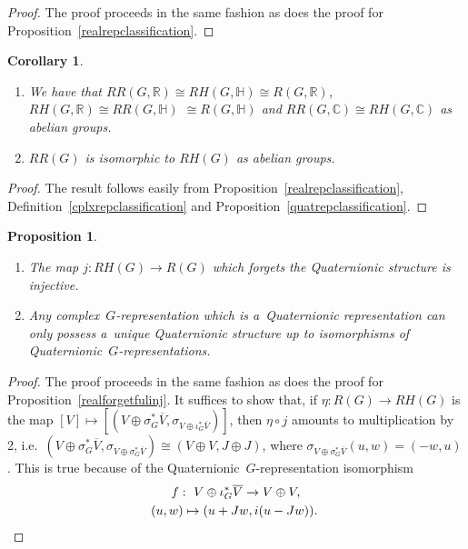 \documentclass[pdftex]{sigma}
\numberwithin{equation}{section}
\newtheorem{Corollary}[Theorem]{Corollary}
\newtheorem{Proposition}[Theorem]{Proposition}
{\theoremstyle{definition}
\newtheorem{Definition}[Theorem]{Definition}
\newtheorem{Example}[Theorem]{Example}
\newtheorem{Remark}[Theorem]{Remark}
}
\begin{document}
\begin{proof}
The proof proceeds in the same fashion as does the proof for Proposition~\ref{realrepclassification}.
\end{proof}
\begin{Corollary}\label{3by3table}\quad
\begin{enumerate}\itemsep=0pt
\item[$1.$]
We have that $RR(G, \mathbb{R})\cong RH(G, \mathbb{H})\cong R(G, \mathbb{R})$, $RH(G, \mathbb{R})\cong RR(G,\mathbb{H})$
$\cong R(G, \mathbb{H})$ and $RR(G, \mathbb{C})\cong RH(G, \mathbb{C})$ as abelian groups.
\item[$2.$]
$RR(G)$ is isomorphic to $RH(G)$ as abelian groups.
\end{enumerate}
\end{Corollary}

\begin{proof}
The result follows easily from Proposition~\ref{realrepclassification}, Def\/inition~\ref{cplxrepclassification} and
Proposition~\ref{quatrepclassification}.
\end{proof}
\begin{Proposition}\label{quatforgetfulinj}\quad
\begin{enumerate}\itemsep=0pt
\item[$1.$]
The map $j: RH(G)\to R(G)$ which forgets the Quaternionic structure is injective.
\item[$2.$]
Any complex~$G$-representation which is a~Quaternionic representation can only possess a~unique Quaternionic structure
up to isomorphisms of Quaternionic~$G$-representations.
\end{enumerate}
\end{Proposition}
\begin{proof}
The proof proceeds in the same fashion as does the proof for Proposition~\ref{realforgetfulinj}.
It suf\/f\/ices to show that, if $\eta: R(G)\to RH(G)$ is the map $[V]\mapsto [(V\oplus
\sigma_G^*\overline{V},
\sigma_{V\oplus\iota_G^*\overline{V}})]$, then $\eta\circ j$ amounts to multiplication by 2, i.e.\
$(V\oplus\sigma_G^*\overline{V},\sigma_{V\oplus\sigma_G^*\overline{V}})\cong(V\oplus V, J\oplus J)$, where $\sigma_{V\oplus\sigma_G^*\overline{V}}(u, w)=(-w, u)$.
This is true because of the Quaternionic~$G$-representation isomorphism
\begin{gather*}
f: \  V\oplus\iota_G^*\overline{V}  \to   V\oplus V,\\
\hphantom{f: {}}  \ (u, w) \mapsto  (u+Jw, i(u-Jw)). \tag*{\qed}
\end{gather*}
\renewcommand{\qed}{}
\end{proof}
\end{document}
